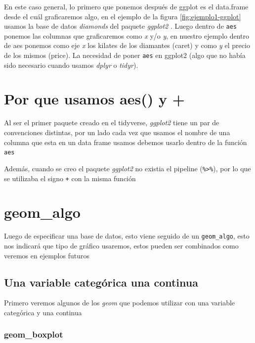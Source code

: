\documentclass[]{book}
\begin{document}
En este caso general, lo primero que ponemos después de ggplot es el
data.frame desde el cuál graficaremos algo, en el ejemplo de la figura
\ref{fig:ejemplo1-ggplot} usamos la base de datos \emph{diamonds} del
paquete \emph{ggplot2} \citep{Wickhamggplot}. Luego dentro de
\texttt{aes} ponemos las columnas que graficaremos como \emph{x} y/o
\emph{y}, en nuestro ejemplo dentro de aes ponemos como eje \emph{x} los
kilates de los diamantes (caret) y como \emph{y} el precio de los mismos
(price). La necesidad de poner \texttt{aes} en ggplot2 (algo que no
había sido necesario cuando usamos \emph{dplyr} o \emph{tidyr}).

\hypertarget{por-que-usamos-aes-y}{%
\section{Por que usamos aes() y +}\label{por-que-usamos-aes-y}}

Al ser el primer paquete creado en el tidyverse, \emph{ggplot2} tiene un
par de convenciones distintas, por un lado cada vez que usamos el nombre
de una columna que esta en un data frame usamos debemos usarlo dentro de
la función \texttt{aes}

Además, cuando se creo el paquete \emph{ggplot2} no existia el pipeline
(\texttt{\%\textgreater{}\%}), por lo que se utilizaba el signo
\texttt{+} con la misma función

\hypertarget{geom_algo}{%
\section{geom\_algo}\label{geom_algo}}

Luego de especificar una base de datos, esto viene seguido de un
\texttt{geom\_algo}, esto nos indicará que tipo de gráfico usaremos,
estos pueden ser combinados como veremos en ejemplos futuros

\hypertarget{una-variable-categorica-una-continua}{%
\subsection{Una variable categórica una
continua}\label{una-variable-categorica-una-continua}}

Primero veremos algunos de los \emph{geom} que podemos utilizar con una
variable categórica y una continua

\hypertarget{geom_boxplot}{%
\subsubsection{geom\_boxplot}\label{geom_boxplot}}
\end{document}

